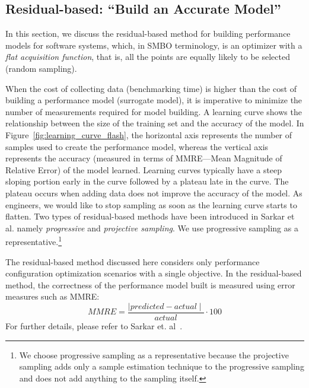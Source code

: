 \subsection{Residual-based: ``Build an Accurate Model''}\label{sec:residual_flash}
In this section, we discuss the residual-based method for building performance models for software systems, which, in SMBO terminology, is an optimizer with a \textit{flat acquisition function}, that is, all the points are equally likely to be selected (random sampling). 

When the cost of collecting data (benchmarking time) is higher than the cost of building a performance model (surrogate model), it is imperative to minimize the number of measurements required for model building. A learning curve shows the relationship between the size of the training set and the accuracy of the model. In Figure~\ref{fig:learning_curve_flash}, the horizontal axis represents the number of samples used to create the performance model, whereas the vertical axis represents the accuracy (measured in terms of MMRE---Mean Magnitude of Relative Error) of the model learned. 
Learning curves typically have a steep sloping portion early in the curve followed by a plateau late in the curve. The plateau occurs when adding data does not improve the accuracy of the model. As engineers, we would like to stop sampling as soon as the learning curve starts to flatten. 
Two types of residual-based methods have been introduced in Sarkar et al. namely \textit{progressive} and \textit{projective sampling}. We use progressive sampling as a representative.\footnote{We choose progressive sampling as a representative because the projective sampling adds only a sample estimation technique to the progressive sampling and does not add anything to the sampling itself.}


The residual-based method discussed here considers only performance configuration optimization scenarios with a single objective. In the residual-based method, the correctness of the performance model built is measured using error measures such as MMRE:
\begin{equation}
\mathit{MMRE}=\frac{\mid\mathit{predicted} - \mathit{actual}\mid}{\mathit{actual}} \cdot 100
\label{eq:err_flash}
\end{equation}
For further details, please refer to Sarkar et. al~\cite{sarkar2015cost}.

